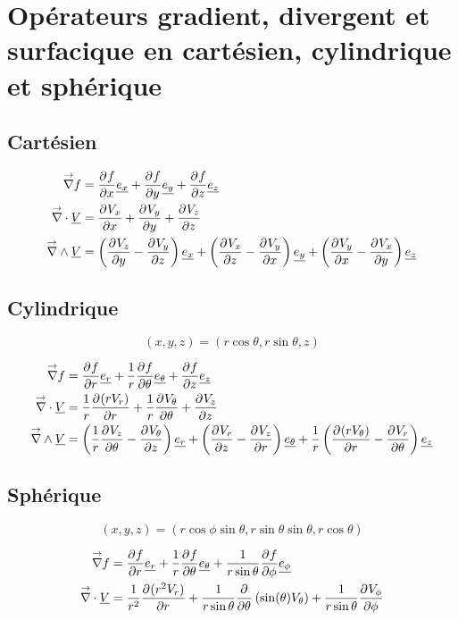 \section{Opérateurs gradient, divergent et surfacique en cartésien, cylindrique et sphérique}

\subsection{Cartésien}

    \begin{align}
        \vgrad f &= \ddr{x}{f}\v{e_x} + \ddr{y}{f}\v{e_y}  + \ddr{z}{f}\v{e_z} \\
        \vdiv \v{V} &= \ddr{x}{V_x} + \ddr{y}{V_y} + \ddr{z}{V_z} \\
        \vrot\v{V} &= \left(\ddr{y}{V_z}-\ddr{z}{V_y}\right)\v{e_x} + \left(\ddr{z}{V_x}-\ddr{x}{V_y}\right)\v{e_y} + \left(\ddr{x}{V_y}-\ddr{y}{V_x}\right)\v{e_z} 
    \end{align}

\subsection{Cylindrique}

    \[
        (x,y,z) = (r\cos\theta,r\sin\theta,z)
    \]

    \begin{align}
        \vgrad f &= \ddr{r}{f}\v{e_r}
        +\frac{1}{r}\ddr{\theta}{f}\v{e_\theta} + \ddr{z}{f}\v{e_z}
        \\
        \vdiv \v{V} &= \frac{1}{r}\ddr{r}{(rV_r)}+\frac{1}{r}\ddr{\theta}{V_\theta}+\ddr{z}{V_z}
        \\
        \vrot \v{V} &= \left(\frac{1}{r}\ddr{\theta}{V_z} - \ddr{z}{V_\theta}\right)\v{e_r} + 
        \left(\ddr{z}{V_r} - \ddr{r}{V_z}\right)\v{e_\theta} +
        \frac{1}{r}\left(\ddr{r}{(rV_\theta)}-\ddr{\theta}{V_r}\right)\v{e_z} 
    \end{align}

\subsection{Sphérique}

    \[
        (x,y,z) = (r\cos\phi\sin\theta,r\sin\theta\sin\theta,r\cos\theta)
    \]

    \begin{align}
        \vgrad f &= \ddr{r}{f}\v{e_r}
        +\frac{1}{r}\ddr{\theta}{f}\v{e_\theta} + \frac{1}{r\sin\theta}\ddr{\phi}{f}\v{e_\phi}
        \\
        \vdiv \v{V} &= \frac{1}{r^2}\ddr{r}{(r^2V_r)}
        + \frac{1}{r\sin\theta}\ddr{\theta}{}\left(\sin(\theta)V_\theta\right) + \frac{1}{r\sin\theta}\ddr{\phi}{V_\phi}
    \end{align}

